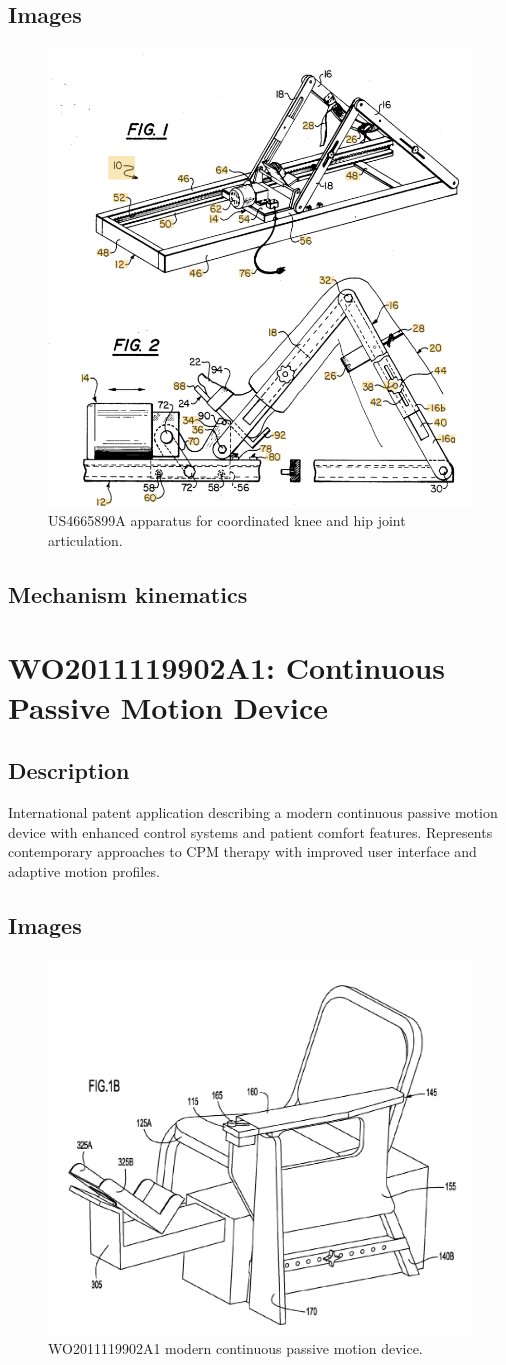 \documentclass[11pt]{article}
\begin{document}
\subsection{Images}
\begin{figure}[H]
  \centering
  \includegraphics[width=0.54\linewidth]{US4665899A.png}
  \caption{US4665899A apparatus for coordinated knee and hip joint articulation.}
  \label{fig:US4665899A}
\end{figure}

\subsection{Mechanism kinematics}

\section{WO2011119902A1: Continuous Passive Motion Device}
\subsection{Description}
International patent application describing a modern continuous passive motion device with enhanced control systems and patient comfort features. Represents contemporary approaches to CPM therapy with improved user interface and adaptive motion profiles.
\subsection{Images}
\begin{figure}[H]
  \centering
  \includegraphics[width=0.54\linewidth]{WO2011119902A1.png}
  \caption{WO2011119902A1 modern continuous passive motion device.}
  \label{fig:WO2011119902A1}
\end{figure}
\end{document}
